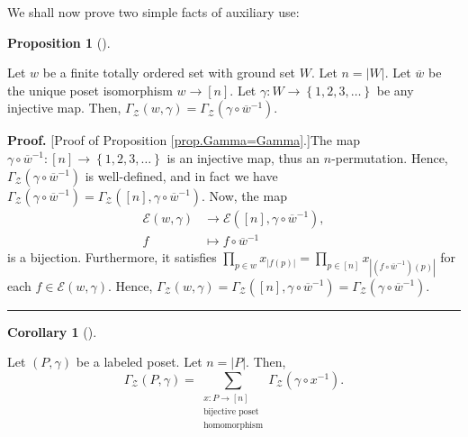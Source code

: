 \documentclass[numbers=enddot,12pt,final,onecolumn,notitlepage]{scrartcl}%
\theoremstyle{definition}
\newtheorem{prop}[theo]{Proposition}
\newenvironment{proposition}[1][]
{\begin{prop}[#1]\begin{leftbar}}
{\end{leftbar}\end{prop}}
\newtheorem{coro}[theo]{Corollary}
\newenvironment{corollary}[1][]
{\begin{coro}[#1]\begin{leftbar}}
{\end{leftbar}\end{coro}}
\newenvironment{proof}[1][Proof]{\noindent\textbf{#1.} }{\ \rule{0.5em}{0.5em}}
\let\sumnonlimits\sum
\let\prodnonlimits\prod
\renewcommand{\sum}{\sumnonlimits\limits}
\renewcommand{\prod}{\prodnonlimits\limits}
\begin{document}
We shall now prove two simple facts of auxiliary use:

\begin{proposition}
\label{prop.Gamma=Gamma}Let $w$ be a finite totally ordered set with ground
set $W$. Let $n=\left\vert W\right\vert $. Let $\overline{w}$ be the unique
poset isomorphism $w\rightarrow\left[  n\right]  $. Let $\gamma:W\rightarrow
\left\{  1,2,3,\ldots\right\}  $ be any injective map. Then, $\Gamma
_{\mathcal{Z}}\left(  w,\gamma\right)  =\Gamma_{\mathcal{Z}}\left(
\gamma\circ\overline{w}^{-1}\right)  $.
\end{proposition}

\begin{proof}
[Proof of Proposition \ref{prop.Gamma=Gamma}.]The map $\gamma\circ\overline
{w}^{-1}:\left[  n\right]  \rightarrow\left\{  1,2,3,\ldots\right\}  $ is an
injective map, thus an $n$-permutation. Hence, $\Gamma_{\mathcal{Z}}\left(
\gamma\circ\overline{w}^{-1}\right)  $ is well-defined, and in fact we have
$\Gamma_{\mathcal{Z}}\left(  \gamma\circ\overline{w}^{-1}\right)
=\Gamma_{\mathcal{Z}}\left(  \left[  n\right]  ,\gamma\circ\overline{w}%
^{-1}\right)  $. Now, the map%
\begin{align*}
\mathcal{E}\left(  w,\gamma\right)   &  \rightarrow\mathcal{E}\left(  \left[
n\right]  ,\gamma\circ\overline{w}^{-1}\right)  ,\\
f  &  \mapsto f\circ\overline{w}^{-1}%
\end{align*}
is a bijection. Furthermore, it satisfies $\prod_{p\in w}x_{\left\vert
f\left(  p\right)  \right\vert }=\prod_{p\in\left[  n\right]  }x_{\left\vert
\left(  f\circ\overline{w}^{-1}\right)  \left(  p\right)  \right\vert }$ for
each $f\in\mathcal{E}\left(  w,\gamma\right)  $. Hence, $\Gamma_{\mathcal{Z}%
}\left(  w,\gamma\right)  =\Gamma_{\mathcal{Z}}\left(  \left[  n\right]
,\gamma\circ\overline{w}^{-1}\right)  =\Gamma_{\mathcal{Z}}\left(  \gamma
\circ\overline{w}^{-1}\right)  $.
\end{proof}

\begin{corollary}
\label{cor.fund-lem2}Let $\left(  P,\gamma\right)  $ be a labeled poset. Let
$n=\left\vert P\right\vert $. Then,%
\[
\Gamma_{\mathcal{Z}}\left(  P,\gamma\right)  =\sum_{\substack{x:P\rightarrow
\left[  n\right]  \\\text{bijective poset}\\\text{homomorphism}}%
}\Gamma_{\mathcal{Z}}\left(  \gamma\circ x^{-1}\right)  .
\]

\end{corollary}
\end{document}
